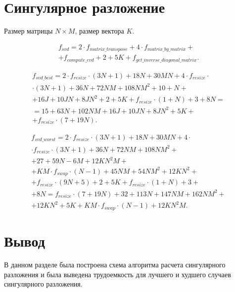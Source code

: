 \section{Сингулярное разложение}

Размер матрицы $N \times M$, размер вектора $K$.

\begin{equation}
	\begin{gathered}
		f_{svd} = 2 \cdot f_{matrix\_transpose} + 4 \cdot f_{matrix\_by\_matrix} +\\+ 
		f_{compute\_evd} + 2 + 5K + f_{get\_inverse\_diagonal\_matrix}.
	\end{gathered}
\end{equation}

\begin{equation}
	\begin{gathered}
		f_{svd\_best} = 2 \cdot f_{resize} \cdot (3N + 1) + 18N + 30MN + 4 \cdot  f_{resize} \cdot\\\cdot (3N + 1) + 36N + 72NM + 108NM^2 + 
		10 + N +\\+ 16J + 10JN + 8JN^2 + 2 + 5K + f_{resize} \cdot (1 + N) + 3 + 8N =\\=
		15 + 63N + 102NM + 16J + 10JN + 8JN^2 + 5K +\\+ f_{resize} \cdot (7 + 19N).
	\end{gathered}
\end{equation}

\begin{equation}
	\begin{gathered}
		f_{svd\_worst} = 2 \cdot f_{resize} \cdot (3N + 1) + 18N + 30MN + 4 \cdot\\\cdot f_{resize} \cdot (3N + 1) + 36N + 72NM + 108NM^2 +\\+ 
		27 + 59N -6M + 12KN^2M +\\+ KM \cdot f_{swap} \cdot (N - 1) + 45NM + 54NM^2 + 12KN^2 +\\+
		f_{resize} \cdot (9N + 5) + 2 + 5K + f_{resize} \cdot (1 + N) + 3 +\\+ 8N = f_{resize} \cdot (7 + 19N) + 32 + 113N + 147NM + 162NM^2 +\\+ 12KN^2 + 5K + KM \cdot f_{swap} \cdot (N - 1) + 12KN^2M.
	\end{gathered}
\end{equation}





\section*{Вывод}

В данном разделе была построена схема алгоритма расчета сингулярного разложения и была выведена трудоемкость для лучшего и худшего случаев сингулярного разложения.









